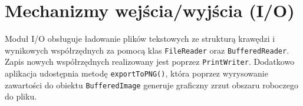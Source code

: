 \documentclass[12pt, a4paper]{article}
\begin{document}
\section{Mechanizmy wejścia/wyjścia (I/O)}
Moduł I/O obsługuje ładowanie plików tekstowych ze strukturą krawędzi i wynikowych współrzędnych za pomocą klas \texttt{FileReader} oraz \texttt{BufferedReader}. Zapis nowych współrzędnych realizowany jest poprzez \texttt{PrintWriter}. Dodatkowo aplikacja udostępnia metodę \texttt{exportToPNG()}, która poprzez wyrysowanie zawartości do obiektu \texttt{BufferedImage} generuje graficzny zrzut obszaru roboczego do pliku.
\end{document}
